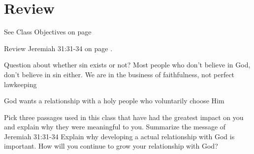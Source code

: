 \chapter{Review}

\begin{goals}
\goal See Class Objectives on page \pageref{sec:ClassObjectives}
\end{goals}
\begin{bible}
Review Jeremiah 31:31-34 on page \pageref{sec:KeyPassage}.
\end{bible}

\begin{discussion}
Question about whether sin exists or not? Most people who don't believe in God, don't believe in sin either.
We are in the business of faithfulness, not perfect lawkeeping

God wants a relationship with a holy people who voluntarily choose Him




\end{discussion}

\begin{questions}
\q Pick three passages used in this class that have had the greatest impact on you and explain why they were meaningful to you.
\q Summarize the message of Jeremiah 31:31-34
\q Explain why developing a actual relationship with God is important.
\q How will you continue to grow your relationship with God?
\end{questions}